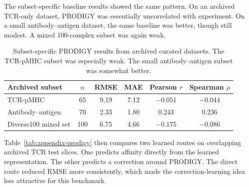 The subset-specific baseline results showed the same pattern. On an archived TCR-only dataset, PRODIGY was essentially uncorrelated with experiment. On a small antibody--antigen dataset, the same baseline was better, though still modest. A mixed 100-complex subset was again weak.

\begin{table}[t]
\centering
\small
\begin{tabular}{|l|c|c|c|c|c|}
\hline
Archived subset & $n$ & RMSE & MAE & Pearson $r$ & Spearman $\rho$ \\
\hline
TCR-pMHC & 65 & 9.19 & 7.12 & $-0.051$ & $-0.044$ \\
Antibody--antigen & 70 & 2.33 & 1.80 & 0.243 & 0.236 \\
Diverse100 mixed set & 100 & 6.75 & 4.66 & $-0.175$ & $-0.086$ \\
\hline
\end{tabular}
\caption{Subset-specific PRODIGY results from archived curated datasets. The TCR-pMHC subset was especially weak. The small antibody--antigen subset was somewhat better.}
\label{tab:appendix-prodigy-subgroups}
\end{table}

Table~\ref{tab:appendix-prodigy} then compares two learned routes on overlapping archived TCR test slices. One predicts affinity directly from the learned representation. The other predicts a correction around PRODIGY. The direct route reduced RMSE more consistently, which made the correction-learning idea less attractive for this benchmark.

\begin{table}[t]
\centering
\small
{}
\caption{Representative PRODIGY-based regression runs on the archived TCR subset. The direct model is the learned latent-space regressor. The corrected model tries to learn an adjustment to PRODIGY.}
\label{tab:appendix-prodigy}
\end{table}

